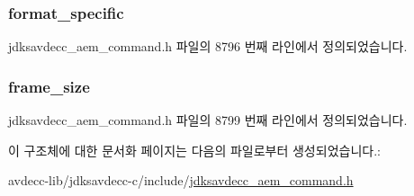 \subsubsection[{\texorpdfstring{format\+\_\+specific}{format_specific}}]{ format\+\_\+specific}\hypertarget{structjdksavdecc__aem__command__get__video__format__response_acbfc36b550978f88cf0a3d9d2b2ce0dd}{}\label{structjdksavdecc__aem__command__get__video__format__response_acbfc36b550978f88cf0a3d9d2b2ce0dd}


jdksavdecc\+\_\+aem\+\_\+command.\+h 파일의 8796 번째 라인에서 정의되었습니다.

\subsubsection[{\texorpdfstring{frame\+\_\+size}{frame_size}}]{ frame\+\_\+size}\hypertarget{structjdksavdecc__aem__command__get__video__format__response_a0229abcfe4414f86dcf52c5ebf84311c}{}\label{structjdksavdecc__aem__command__get__video__format__response_a0229abcfe4414f86dcf52c5ebf84311c}


jdksavdecc\+\_\+aem\+\_\+command.\+h 파일의 8799 번째 라인에서 정의되었습니다.



이 구조체에 대한 문서화 페이지는 다음의 파일로부터 생성되었습니다.\+:\begin{DoxyCompactItemize}
\item 
avdecc-\/lib/jdksavdecc-\/c/include/\hyperlink{jdksavdecc__aem__command_8h}{jdksavdecc\+\_\+aem\+\_\+command.\+h}\end{DoxyCompactItemize}
